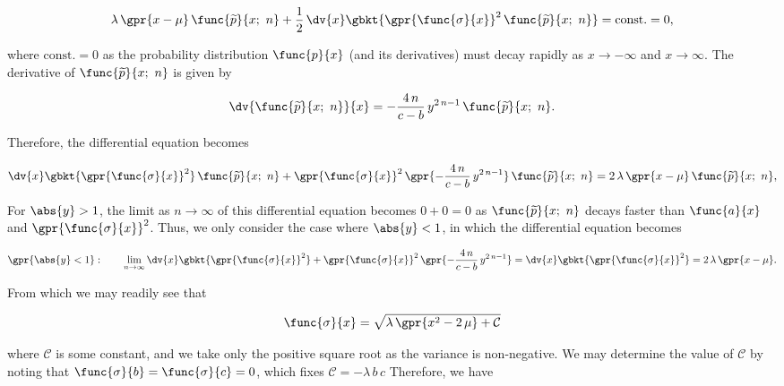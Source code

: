 \begin{equation}
	\lambda\,\gpr{x - \mu}\,\func{\widetilde{p}}{x;\ n} + \frac{1}{2}\,\dv{x} \gbkt{\gpr{\func{\sigma}{x}}^2\,\func{\widetilde{p}}{x;\ n}} = \text{const.} = 0,
\end{equation}

where $\text{const.} = 0$ as the probability distribution $\func{p}{x}$ (and its derivatives) must decay rapidly as $x \to -\infty$ and $x \to \infty$. The derivative of $\func{\widetilde{p}}{x;\ n}$ is given by

\begin{equation}
	\dv{\func{\widetilde{p}}{x;\ n}}{x} = -\frac{4\,n}{c - b}\,y^{2\,n-1}\,\func{\widetilde{p}}{x;\ n}.
\end{equation}

Therefore, the differential equation becomes

\begin{equation}
	\dv{x} \gbkt{\gpr{\func{\sigma}{x}}^2}\,\func{\widetilde{p}}{x;\ n} + \gpr{\func{\sigma}{x}}^2\,\gpr{-\frac{4\,n}{c - b}\,y^{2\,n-1}}\,\func{\widetilde{p}}{x;\ n} = 2\,\lambda\,\gpr{x - \mu}\,\func{\widetilde{p}}{x;\ n},
\end{equation}

For $\abs{y} > 1$, the limit as $n \to \infty$ of this differential equation becomes $0 + 0 = 0$ as $\func{\widetilde{p}}{x;\ n}$ decays faster than $\func{a}{x}$ and $\gpr{\func{\sigma}{x}}^2$. Thus, we only consider the case where $\abs{y} < 1$, in which the differential equation becomes

\begin{equation}
	\gpr{\abs{y} < 1}:\qquad \lim_{n \to \infty} \dv{x} \gbkt{\gpr{\func{\sigma}{x}}^2} + \gpr{\func{\sigma}{x}}^2\,\gpr{-\frac{4\,n}{c - b}\,y^{2\,n-1}} = \dv{x} \gbkt{\gpr{\func{\sigma}{x}}^2} = 2\,\lambda\,\gpr{x - \mu}.
\end{equation}

From which we may readily see that 

\begin{equation}
	\func{\sigma}{x} = \sqrt{\lambda\,\gpr{x^2 - 2\,\mu} + \mathcal{C}}
\end{equation}

where $\mathcal{C}$ is some constant, and we take only the positive square root as the variance is non-negative. We may determine the value of $\mathcal{C}$ by noting that $\func{\sigma}{b} = \func{\sigma}{c} = 0$, which fixes $\mathcal{C} = -\lambda\,b\,c$ Therefore, we have

